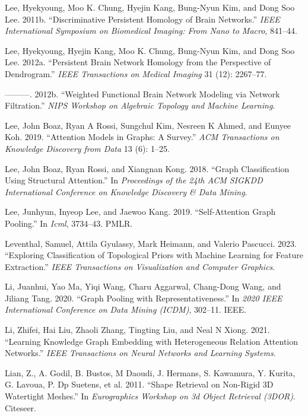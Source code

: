 \documentclass[
  12pt,
]{krantz}
\newlength{\cslhangindent}
\newenvironment{CSLReferences}[2] %
 {\begin{list}{}{%
  \setlength{\itemindent}{0pt}
  \setlength{\leftmargin}{0pt}
  \setlength{\parsep}{0pt}
  \ifodd #1
   \setlength{\leftmargin}{\cslhangindent}
   \setlength{\itemindent}{-1\cslhangindent}
  \fi
  \setlength{\itemsep}{#2\baselineskip}}}
 {\end{list}}
\begin{document}
\begin{CSLReferences}{1}{0}
Lee, Hyekyoung, Moo K. Chung, Hyejin Kang, Bung-Nyun Kim, and Dong Soo
Lee. 2011b. {``Discriminative Persistent Homology of Brain Networks.''}
\emph{{IEEE} International Symposium on Biomedical Imaging: From Nano to
Macro}, 841--44.

Lee, Hyekyoung, Hyejin Kang, Moo K. Chung, Bung-Nyun Kim, and Dong Soo
Lee. 2012a. {``Persistent Brain Network Homology from the Perspective of
Dendrogram.''} \emph{{IEEE} Transactions on Medical Imaging} 31 (12):
2267--77.

---------. 2012b. {``Weighted Functional Brain Network Modeling via
Network Filtration.''} \emph{NIPS Workshop on Algebraic Topology and
Machine Learning}.

Lee, John Boaz, Ryan A Rossi, Sungchul Kim, Nesreen K Ahmed, and Eunyee
Koh. 2019. {``Attention Models in Graphs: A Survey.''} \emph{ACM
Transactions on Knowledge Discovery from Data} 13 (6): 1--25.

Lee, John Boaz, Ryan Rossi, and Xiangnan Kong. 2018. {``Graph
Classification Using Structural Attention.''} In \emph{Proceedings of
the 24th ACM SIGKDD International Conference on Knowledge Discovery \&
Data Mining}.

Lee, Junhyun, Inyeop Lee, and Jaewoo Kang. 2019. {``Self-Attention Graph
Pooling.''} In \emph{Icml}, 3734--43. PMLR.

Leventhal, Samuel, Attila Gyulassy, Mark Heimann, and Valerio Pascucci.
2023. {``Exploring Classification of Topological Priors with Machine
Learning for Feature Extraction.''} \emph{IEEE Transactions on
Visualization and Computer Graphics}.

Li, Juanhui, Yao Ma, Yiqi Wang, Charu Aggarwal, Chang-Dong Wang, and
Jiliang Tang. 2020. {``Graph Pooling with Representativeness.''} In
\emph{2020 IEEE International Conference on Data Mining (ICDM)},
302--11. IEEE.

Li, Zhifei, Hai Liu, Zhaoli Zhang, Tingting Liu, and Neal N Xiong. 2021.
{``Learning Knowledge Graph Embedding with Heterogeneous Relation
Attention Networks.''} \emph{IEEE Transactions on Neural Networks and
Learning Systems}.

Lian, Z., A. Godil, B. Bustos, M Daoudi, J. Hermans, S. Kawamura, Y.
Kurita, G. Lavoua, P. Dp Suetens, et al. 2011. {``Shape Retrieval on
Non-Rigid 3{D} Watertight Meshes.''} In \emph{Eurographics Workshop on
3d Object Retrieval (3DOR)}. Citeseer.


\end{CSLReferences}
\end{document}
